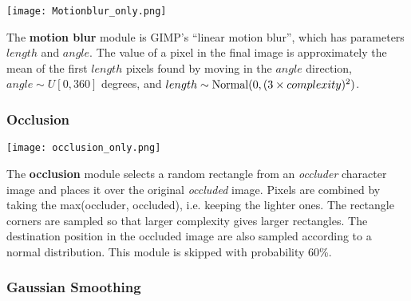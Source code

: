 \documentclass{article} %
\begin{document}
\begin{minipage}[t]{0.14\linewidth}
\centering
\vspace*{0mm}
\texttt{[image: Motionblur\_only.png]}
\end{minipage}%
\hspace{0.3cm}\begin{minipage}[t]{0.83\linewidth}
\vspace*{2mm}
The {\bf motion blur} module is GIMP's ``linear motion blur'', which
has parameters $length$ and $angle$. The value of
a pixel in the final image is approximately the  mean of the first $length$ pixels
found by moving in the $angle$ direction,
$angle \sim U[0,360]$ degrees, and $length \sim {\rm Normal}(0,(3 \times complexity)^2)$.
\end{minipage}


\subsubsection*{Occlusion}

\begin{minipage}[t]{0.14\linewidth}
\centering
\vspace*{3mm}
\texttt{[image: occlusion\_only.png]}\\
\end{minipage}%
\hspace{0.3cm}\begin{minipage}[t]{0.83\linewidth}
The {\bf occlusion} module selects a random rectangle from an {\em occluder} character
image and places it over the original {\em occluded}
image. Pixels are combined by taking the max(occluder, occluded),
i.e. keeping the lighter ones.
The rectangle corners
are sampled so that larger complexity gives larger rectangles.
The destination position in the occluded image are also sampled
according to a normal distribution.
This module is skipped with probability 60\%.
\end{minipage}

\subsubsection*{Gaussian Smoothing}
\end{document}
